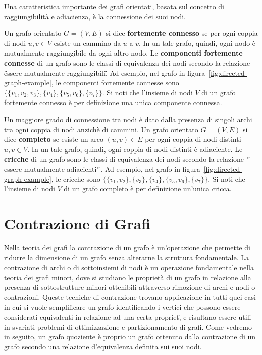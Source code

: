 Una caratteristica importante dei grafi orientati, basata sul concetto di raggiungibilit\`a e adiacienza,
\`e la connessione dei suoi nodi.
\newline

Un grafo orientato $G = (V, E)$ si dice \textbf{fortemente connesso} se per ogni coppia di nodi $u, v \in V$ esiste un
cammino da $u$ a $v$. \newline
In un tale grafo, quindi, ogni nodo \`e mutualmente raggiungibile da ogni altro nodo.
Le \textbf{componenti fortemente connesse} di un grafo sono le classi di equivalenza dei nodi secondo la relazione
\"essere mutualmente raggiungibili\".
Ad esempio, nel grafo in figura~\ref{fig:directed-graph-example}, le componenti fortemente connesse sono
$\{\{v_1, v_2, v_3\}, \{v_4\}, \{v_5, v_6\}, \{v_7\}\}$.
Si noti che l'insieme di nodi $V$ di un grafo fortemente connesso \`e per definizione una unica componente connessa.
\newline

Un maggiore grado di connessione tra nodi \`e dato dalla presenza di singoli archi tra ogni coppia di nodi anzich\`e
di cammini. \newline
Un grafo orientato $G = (V, E)$ si dice \textbf{completo} se esiste un arco $(u, v) \in E$ per ogni coppia di nodi
distinti $u, v \in V$.
In un tale grafo, quindi, ogni coppia di nodi distinti \`e adiaciente.
Le \textbf{cricche} di un grafo sono le classi di equivalenza dei nodi secondo la relazione
\("\)essere mutualmente adiacienti\("\).
Ad esempio, nel grafo in figura~\ref{fig:directed-graph-example}, le cricche sono
$\{\{v_1, v_2\}, \{v_3\}, \{v_4\}, \{v_5, v_6\}, \{v_7\}\}$.
Si noti che l'insieme di nodi $V$ di un grafo completo \`e per definizione un'unica cricca.
\newline


\section{Contrazione di Grafi}\label{sec:contrazione-di-grafi}

Nella teoria dei grafi la contrazione di un grafo \`e un'operazione che permette di ridurre la dimensione di un grafo
senza alterarne la struttura fondamentale. \newline
La contrazione di archi o di sottoinsiemi di nodi \`e un operazione fondamentale nella teoria dei grafi minori, dove
si studiano le propriet\`a di un grafo in relazione alla presenza di sottostrutture minori ottenibili attraverso
rimozione di archi e nodi o contrazioni. \newline
Queste tecniche di contrazione trovano applicazione in tutti quei casi in cui si vuole semplificare un grafo
identificando i vertici che possono essere considerati equivalenti in relazione ad una certa propriet\`,
e risultano essere utili in svariati problemi di ottimizzazione e partizionamento di grafi.
Come vedremo in seguito, un grafo quoziente \`e proprio un grafo ottenuto dalla contrazione di un grafo secondo
una relazione d'equivalenza definita sui suoi nodi. \newline


